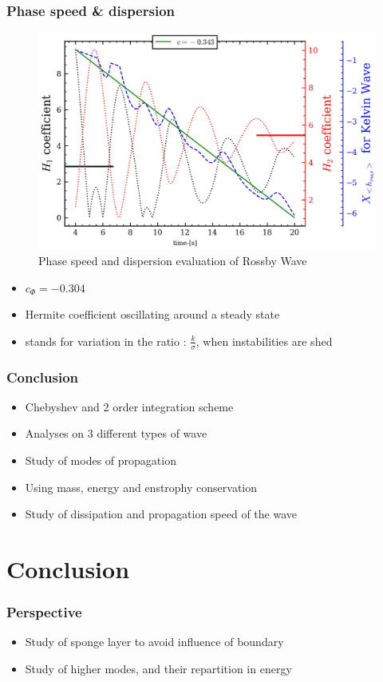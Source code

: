 \documentclass[numbering=fraction]{beamer}
\begin{document}
\begin{frame}
    \frametitle{Phase speed \& dispersion}
    \begin{minipage}{.6\linewidth}
        \begin{figure}[H]
            \includegraphics[width=1\linewidth]{./figure/0velocity_wave_params_rossby.png}
            \caption{Phase speed and dispersion evaluation of Rossby Wave}
        \end{figure}
    \end{minipage}
    \begin{minipage}{.3\linewidth}
        \begin{itemize}
            \item $c_\Phi = -0.304$
            \item Hermite coefficient oscillating around a steady state
            \item stands for variation in the ratio : $\frac{k}{\sigma}$, when instabilities are shed
        \end{itemize}
    \end{minipage}
\end{frame}

\begin{frame}
    \frametitle{Conclusion}
    \begin{itemize}
        \item Chebyshev and 2 order integration scheme
        \item Analyses on 3 different types of wave
        \item Study of modes of propagation
        \item Using mass, energy and enstrophy conservation
        \item Study of dissipation and propagation speed of the wave
    \end{itemize}
\end{frame}
\section{Conclusion}
\begin{frame}
    \frametitle{Perspective}
    \begin{itemize}
        \item Study of sponge layer to avoid influence of boundary
        \item Study of higher modes, and their repartition in energy

    \end{itemize}
\end{frame}
\end{document}
